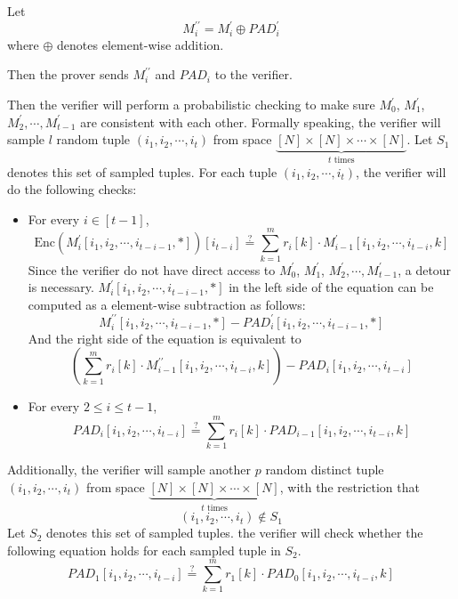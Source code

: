 Let 
$$
M_i^{\prime\prime} = M_i^{\prime} \oplus PAD_i^\prime
$$
where $\oplus$ denotes element-wise addition.

Then the prover sends $M_i^{\prime\prime}$ and $PAD_i$ to the verifier.

Then the verifier will perform a probabilistic checking to make sure 
$M_0^\prime$, $M_1^\prime$, $M_2^\prime, \cdots, M_{t-1}^\prime$ are consistent with each other. Formally speaking, the verifier will sample $l$ random tuple $(i_1, i_2, \cdots, i_t)$ from space $\underbrace{[N] \times [N] \times \cdots \times [N]}_{t \text{ times}}$. Let $S_1$ denotes this set of sampled tuples.
For each tuple $(i_1, i_2, \cdots, i_t)$, the verifier will do the following checks:

\begin{itemize}
    \item 
    For every $i \in [t-1]$,
    $$
        \text{Enc}(M_i^\prime[i_1, i_2, \cdots, i_{t-i-1}, *])[i_{t-i}] \stackrel{?}{=} \sum_{k=1}^m r_i[k] \cdot M_{i-1}^{\prime}[i_1,i_2, \cdots, i_{t-i},k]
    $$
    Since the verifier do not have direct access to $M_0^\prime$, $M_1^\prime$, $M_2^\prime, \cdots, M_{t-1}^\prime$, a detour is necessary. $M_i^\prime[i_1, i_2, \cdots, i_{t-i-1}, *]$ in the left side of the equation can be computed as a element-wise subtraction as follows:
    $$
        M_i^{\prime\prime}[i_1, i_2, \cdots, i_{t-i-1}, *] - PAD_i^\prime[i_1, i_2, \cdots, i_{t-i-1}, *]
    $$
    And the right side of the equation is equivalent to 
    $$
        (\sum_{k=1}^m r_i[k] \cdot M_{i-1}^{\prime\prime}[i_1,i_2, \cdots, i_{t-i},k]) - PAD_i[i_1, i_2, \cdots, i_{t-i}]
    $$
    
    \item
    For every $2 \le i \le t-1$,
    $$
        PAD_i[i_1, i_2, \cdots, i_{t-i}] \stackrel{?}{=} \sum_{k=1}^m r_i[k] \cdot PAD_{i-1}[i_1,i_2, \cdots, i_{t-i},k]
    $$
\end{itemize}

Additionally, the verifier will sample another $p$ random distinct tuple $(i_1, i_2, \cdots, i_t)$ from space $\underbrace{[N] \times [N] \times \cdots \times [N]}_{t \text{ times}}$, with the restriction that 
$$(i_1, i_2, \cdots, i_t) \not\in S_1$$ 
Let $S_2$ denotes this set of sampled tuples. the verifier will check whether the following equation holds for each sampled tuple in $S_2$.
$$
    PAD_1[i_1, i_2, \cdots, i_{t-i}] \stackrel{?}{=} \sum_{k=1}^m r_1[k] \cdot PAD_{0}[i_1,i_2, \cdots, i_{t-i},k]
$$




